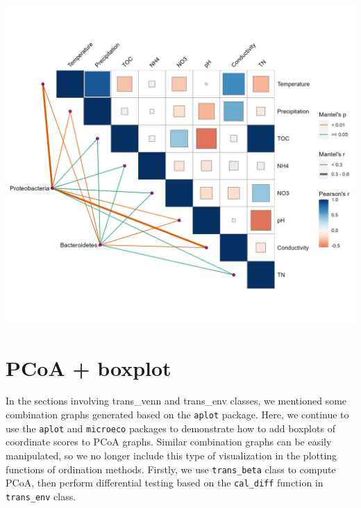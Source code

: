 \documentclass[
]{book}
\begin{document}
\begin{center}\includegraphics[width=650px]{Images/plot_env_mantel_ggcor} \end{center}

\hypertarget{pcoa-boxplot}{%
\section{PCoA + boxplot}\label{pcoa-boxplot}}

In the sections involving trans\_venn and trans\_env classes,
we mentioned some combination graphs generated based on the \texttt{aplot} package.
Here, we continue to use the \texttt{aplot} and \texttt{microeco} packages to demonstrate how to add boxplots of coordinate scores to PCoA graphs.
Similar combination graphs can be easily manipulated, so we no longer include this type of visualization in the plotting functions of ordination methods.
Firstly, we use \texttt{trans\_beta} class to compute PCoA, then perform differential testing based on the \texttt{cal\_diff} function in \texttt{trans\_env} class.
\end{document}
